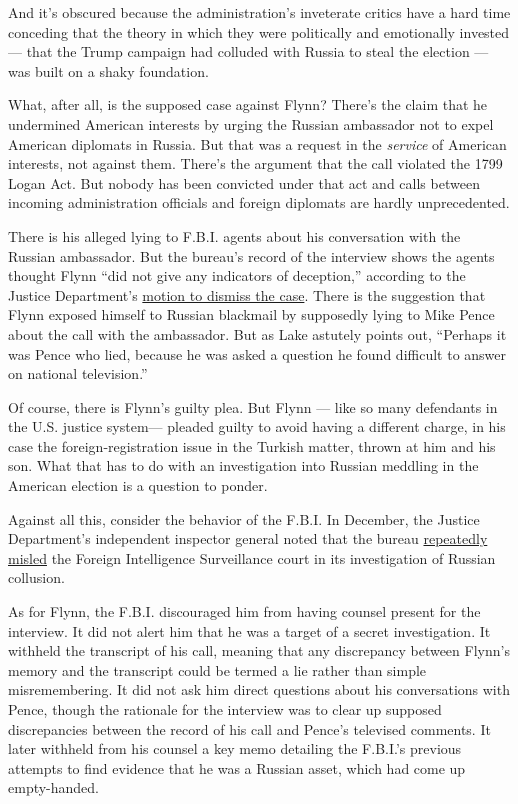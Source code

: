 And it's obscured because the administration's inveterate critics have a
hard time conceding that the theory in which they were politically and
emotionally invested --- that the Trump campaign had colluded with
Russia to steal the election --- was built on a shaky foundation.

What, after all, is the supposed case against Flynn? There's the claim
that he undermined American interests by urging the Russian ambassador
not to expel American diplomats in Russia. But that was a request in the
\emph{service} of American interests, not against them. There's the
argument that the call violated the 1799 Logan Act. But nobody has been
convicted under that act and calls between incoming administration
officials and foreign diplomats are hardly unprecedented.

There is his alleged lying to F.B.I. agents about his conversation with
the Russian ambassador. But the bureau's record of the interview shows
the agents thought Flynn ``did not give any indicators of deception,''
according to the Justice Department's
\href{https://int.graylady3jvrrxbe.onion/data/documenthelper/6936-michael-flynn-motion-to-dismiss/fa06f5e13a0ec71843b6/optimized/full.pdf}{motion
to dismiss the case}. There is the suggestion that Flynn exposed himself
to Russian blackmail by supposedly lying to Mike Pence about the call
with the ambassador. But as Lake astutely points out, ``Perhaps it was
Pence who lied, because he was asked a question he found difficult to
answer on national television.''

Of course, there is Flynn's guilty plea. But Flynn --- like so many
defendants in the U.S. justice system--- pleaded guilty to avoid having
a different charge, in his case the foreign-registration issue in the
Turkish matter, thrown at him and his son. What that has to do with an
investigation into Russian meddling in the American election is a
question to ponder.

Against all this, consider the behavior of the F.B.I. In December, the
Justice Department's independent inspector general noted that the bureau
\href{https://www.nytimes3xbfgragh.onion/interactive/2019/12/09/us/politics/fbi-ig-report-document.html}{repeatedly
misled} the Foreign Intelligence Surveillance court in its investigation
of Russian collusion.

As for Flynn, the F.B.I. discouraged him from having counsel present for
the interview. It did not alert him that he was a target of a secret
investigation. It withheld the transcript of his call, meaning that any
discrepancy between Flynn's memory and the transcript could be termed a
lie rather than simple misremembering. It did not ask him direct
questions about his conversations with Pence, though the rationale for
the interview was to clear up supposed discrepancies between the record
of his call and Pence's televised comments. It later withheld from his
counsel a key memo detailing the F.B.I.'s previous attempts to find
evidence that he was a Russian asset, which had come up empty-handed.

